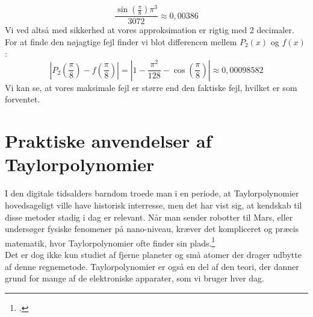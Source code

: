 \documentclass[12pt, a4paper]{article}
\begin{document}
\begin{refsection}
\begin{equation*}
    \frac{\sin\left(\frac{\pi}{8}\right)\pi^3}{3072}\approx 0{,}00386
\end{equation*}
Vi ved altså med sikkerhed at vores approksimation er rigtig med 2 decimaler.\\
For at finde den nøjagtige fejl finder vi blot differencen mellem $P_2(x)$ og $f(x)$ :
\begin{equation*}
    \left|P_2\left(\frac{\pi}{8}\right)-f\left(\frac{\pi}{8}\right)\right|=\left|1-\frac{\pi^2}{128}-\cos\left(\frac{\pi}{8} \right)   \right|\approx 0{,}00098582
\end{equation*}
Vi kan se, at vores maksimale fejl er større end den faktiske fejl, hvilket er som forventet.
\section{Praktiske anvendelser af Taylorpolynomier}
I den digitale tidsalders barndom troede man i en periode, at Taylorpolynomier hovedsageligt ville have historisk interresse, men det har vist sig, at kendskab til disse metoder stadig i dag er relevant. Når man sender robotter til Mars, eller undersøger fysiske fenomener på nano-niveau, kræver det kompliceret og præcis matematik, hvor Taylorpolynomier ofte finder sin plads.\footcite[s. 11]{hvadermatematik}\\
Det er dog ikke kun studiet af fjerne planeter og små atomer der drager udbytte af denne regnemetode. Taylorpolynomier er også en del af den teori, der danner grund for mange af de elektroniske apparater, som vi bruger hver dag. 

\end{refsection}
\end{document}
